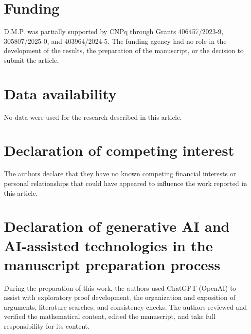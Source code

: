 \documentclass[11pt,a4paper]{article}
\numberwithin{equation}{section}
\theoremstyle{cleanplain}
\theoremstyle{cleandefinition}
\theoremstyle{cleanremark}
\begin{document}
\section*{Funding}
D.M.P. was partially supported by CNPq through Grants
406457/2023-9, 305807/2025-0, and 403964/2024-5.  The funding agency had no
role in the development of the results, the preparation of the manuscript,
or the decision to submit the article.

\section*{Data availability}
No data were used for the research described in this article.

\section*{Declaration of competing interest}
The authors declare that they have no known competing financial interests or
personal relationships that could have appeared to influence the work
reported in this article.

\section*{Declaration of generative AI and AI-assisted technologies in the manuscript preparation process}
During the preparation of this work, the authors used ChatGPT (OpenAI) to
assist with exploratory proof development, the organization and exposition
of arguments, literature searches, and consistency checks.  The authors
reviewed and verified the mathematical content, edited the manuscript, and
take full responsibility for its content.
\end{document}
